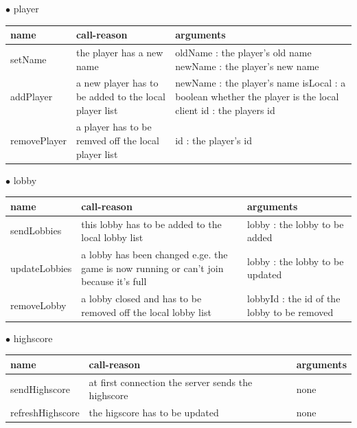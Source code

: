 \documentclass{scrartcl}
\newcommand{\n}{\newline}
\begin{document}
$\bullet$ player
\begin{center}
    \begin{tabular}{| p{3.1cm} | p{5cm} | p{5.9cm} |}
        \hline
        \textbf{name} & \textbf{call-reason} & \textbf{arguments} \\ \hline
        setName & the player has a new name & oldName : the player's old name \n
        newName : the player's new name \\ \hline

        addPlayer & a new player has to be added to the local player list & newName : the player's name \n
        isLocal : a boolean whether the player is the local client \n
        id : the players id \\ \hline

        removePlayer & a player has to be remved off the local player list & id : the player's id \\ \hline 
    \end{tabular}
\end{center}
$\bullet$ lobby
\begin{center}
    \begin{tabular}{| p{3.1cm} | p{5cm} | p{5.9cm} |}
        \hline
        \textbf{name} & \textbf{call-reason} & \textbf{arguments} \\ \hline
        sendLobbies & this lobby has to be added to the local lobby list & lobby : the lobby to be added\\ \hline
        updateLobbies & a lobby has been changed e.ge. the game is now running or can't join because it's full & lobby : the lobby to be updated \\ \hline
        removeLobby & a lobby closed and has to be removed off the local lobby list & lobbyId : the id of the lobby to be removed \\ \hline
    \end{tabular}
\end{center}
$\bullet$ highscore
\begin{center}
    \begin{tabular}{| p{3.1cm} | p{5cm} | p{5.9cm} |}
        \hline
        \textbf{name} & \textbf{call-reason} & \textbf{arguments} \\ \hline
        sendHighscore & at first connection the server sends the highscore & none \\ \hline
        refreshHighscore & the higscore has to be updated & none \\ \hline
    \end{tabular}
\end{center}
\end{document}
